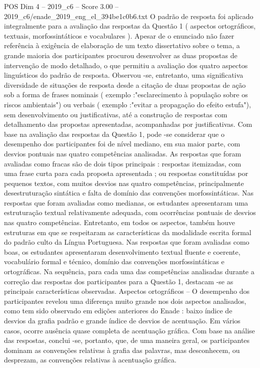 \begin{textsample}{POS Dim 4 – 2019\_c6 – Score 3.00 – 2019\_c6/enade\_2019\_eng\_el\_394be1c0b6.txt}
O padrão de resposta foi aplicado integralmente para a avaliação das respostas da Questão 1 ( aspectos ortográficos, textuais, morfossintáticos e vocabulares ).
Apesar de o enunciado não fazer referência à exigência de elaboração de um texto dissertativo sobre o tema, a grande maioria dos participantes procurou desenvolver as duas propostas de intervenção de modo detalhado, o que permitiu a avaliação dos quatro aspectos linguísticos do padrão de resposta.
Observou -se, entretanto, uma significativa diversidade de situações de resposta desde a citação de duas propostas de ação sob a forma de frases nominais ( exemplo :"esclarecimento à população sobre os riscos ambientais") ou verbais ( exemplo :"evitar a propagação do efeito estufa"), sem desenvolvimento ou justificativas, até a construção de respostas com detalhamento das propostas apresentadas, acompanhadas por justificativas.
Com base na avaliação das respostas da Questão 1, pode -se considerar que o desempenho dos participantes foi de nível mediano, em sua maior parte, com desvios pontuais nas quatro competências analisadas.
As respostas que foram avaliadas como fracas são de dois tipos principais : respostas itemizadas, com uma frase curta para cada proposta apresentada ; ou respostas constituídas por pequenos textos, com muitos desvios nas quatro competências, principalmente desestruturação sintática e falta de domínio das convenções morfossintáticas.
Nas respostas que foram avaliadas como medianas, os estudantes apresentaram uma estruturação textual relativamente adequada, com ocorrências pontuais de desvios nas quatro competências.
Entretanto, em todos os aspectos, também houve estruturas em que se respeitaram as características da modalidade escrita formal do padrão culto da Língua Portuguesa.
Nas respostas que foram avaliadas como boas, os estudantes apresentaram desenvolvimento textual fluente e coerente, vocabulário formal e técnico, domínio das convenções morfossintáticas e ortográficas.
Na sequência, para cada uma das competências analisadas durante a correção das respostas dos participantes para a Questão 1, destacam -se as principais características observadas.
Aspectos ortográficos – O desempenho dos participantes revelou uma diferença muito grande nos dois aspectos analisados, como tem sido observado em edições anteriores do Enade : baixo índice de desvios da grafia padrão e grande índice de desvios de acentuação.
Em vários casos, ocorre ausência quase completa de acentuação gráfica.
Com base na análise das respostas, conclui -se, portanto, que, de uma maneira geral, os participantes dominam as convenções relativas à grafia das palavras, mas desconhecem, ou desprezam, as convenções relativas à acentuação gráfica.

\end{textsample}
